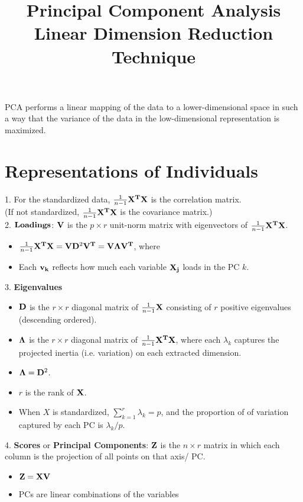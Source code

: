 \documentclass[11pt]{article}
\title{Principal Component Analysis \\
        \large Linear Dimension Reduction Technique}
\date{}
\begin{document}
\maketitle

PCA performs a linear mapping of the data to a lower-dimensional space in such a way that the variance of the data in the low-dimensional representation is maximized.

\section{Representations of Individuals}
1. For the standardized data, $\frac{1}{n-1}{\bf X^T}{\bf X}$ is the correlation matrix. \\ (If not standardized, $\frac{1}{n-1}{\bf X^T}{\bf X}$ is the covariance matrix.) \\

\hspace{-0.68cm} 2. $\bf Loadings$: ${\bf V}$ is the $p \times r$ unit-norm matrix with eigenvectors of $\frac{1}{n-1}{\bf X^T}{\bf X}$.
\begin{itemize}
	\item $\frac{1}{n-1}{\bf X^T}{\bf X} = {\bf V}{\bf D}^2{\bf V^T} = {\bf V}{\bf \Lambda}{\bf V^T}$, where 
	\item Each $\bf v_k$ reflects how much each variable $\bf X_j$ loads in the PC $k$. 
\end{itemize}

\hspace{-0.68cm} 3. \textbf{Eigenvalues}
\begin{itemize}
	\item ${\bf D}$ is the $r \times r$ diagonal matrix of $\frac{1}{n-1}{\bf X}$ consisting of $r$ positive eigenvalues (descending ordered).
	\item ${\bf \Lambda}$ is the $r \times r$ diagonal matrix of $\frac{1}{n-1}{\bf X^T}{\bf X}$, where each $\lambda_k$ captures the projected inertia (i.e. variation) on each extracted dimension.
	\item ${\bf \Lambda} = {\bf D}^2$.
	\item $r$ is the rank of $\bf X$.
	\item When $X$ is standardized, $\sum_{k=1}^r\lambda_k = p$, and the proportion of of variation captured by each PC is $\lambda_k/p$.
\end{itemize}

\hspace{-0.68cm} 4. \textbf{Scores} or \textbf{Principal Components}: $\bf Z$ is the $n \times r$ matrix in which each column is the projection of all points on that axis/ PC.
\begin{itemize}
	\item ${\bf Z} = {\bf XV}$
	\item PCs are linear combinations of the variables
\end{itemize}
\end{document}
